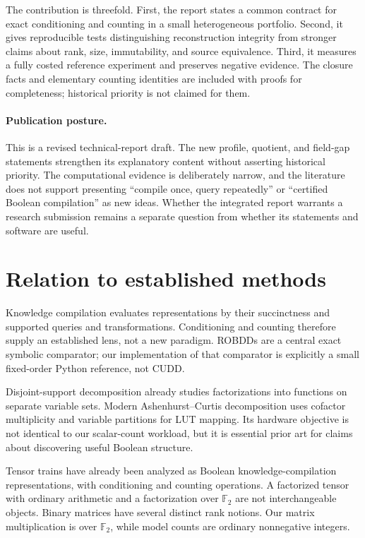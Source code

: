 \documentclass[11pt]{article}
\newcommand{\F}{\mathbb F_2}
\theoremstyle{definition}\newtheorem{definition}[theorem]{Definition}
\theoremstyle{remark}\newtheorem{remark}[theorem]{Remark}
\begin{document}
The contribution is threefold. First, the report states a common contract for exact conditioning and counting in a small heterogeneous portfolio. Second, it gives reproducible tests distinguishing reconstruction integrity from stronger claims about rank, size, immutability, and source equivalence. Third, it measures a fully costed reference experiment and preserves negative evidence. The closure facts and elementary counting identities are included with proofs for completeness; historical priority is not claimed for them.

\paragraph{Publication posture.}
This is a revised technical-report draft. The new profile, quotient, and field-gap statements strengthen its explanatory content without asserting historical priority. The computational evidence is deliberately narrow, and the literature does not support presenting ``compile once, query repeatedly'' or ``certified Boolean compilation'' as new ideas. Whether the integrated report warrants a research submission remains a separate question from whether its statements and software are useful.

\section{Relation to established methods}
Knowledge compilation evaluates representations by their succinctness and supported queries and transformations\cite{darwiche2002}. Conditioning and counting therefore supply an established lens, not a new paradigm. ROBDDs are a central exact symbolic comparator\cite{bryant1986}; our implementation of that comparator is explicitly a small fixed-order Python reference, not CUDD.

Disjoint-support decomposition already studies factorizations into functions on separate variable sets\cite{mishchenko2001}. Modern Ashenhurst--Curtis decomposition uses cofactor multiplicity and variable partitions for LUT mapping\cite{calvino2024}. Its hardware objective is not identical to our scalar-count workload, but it is essential prior art for claims about discovering useful Boolean structure.

Tensor trains have already been analyzed as Boolean knowledge-compilation representations, with conditioning and counting operations\cite{onaka2025}. A factorized tensor with ordinary arithmetic and a factorization over $\F$ are not interchangeable objects. Binary matrices have several distinct rank notions\cite{desantis2021}. Our matrix multiplication is over $\F$, while model counts are ordinary nonnegative integers.
\end{document}
